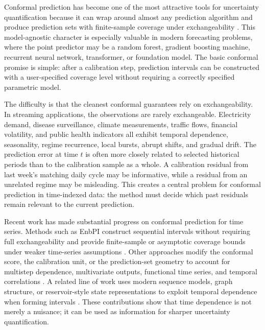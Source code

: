 \documentclass[11pt]{article}
\begin{document}
Conformal prediction has become one of the most attractive tools for uncertainty quantification because it can wrap around almost any prediction algorithm and produce prediction sets with finite-sample coverage under exchangeability \citep{vovk2005algorithmic,angelopoulos2021gentle}. This model-agnostic character is especially valuable in modern forecasting problems, where the point predictor may be a random forest, gradient boosting machine, recurrent neural network, transformer, or foundation model. The basic conformal promise is simple: after a calibration step, prediction intervals can be constructed with a user-specified coverage level without requiring a correctly specified parametric model.

The difficulty is that the cleanest conformal guarantees rely on exchangeability. In streaming applications, the observations are rarely exchangeable. Electricity demand, disease surveillance, climate measurements, traffic flows, financial volatility, and public health indicators all exhibit temporal dependence, seasonality, regime recurrence, local bursts, abrupt shifts, and gradual drift. The prediction error at time $t$ is often more closely related to selected historical periods than to the calibration sample as a whole. A calibration residual from last week's matching daily cycle may be informative, while a residual from an unrelated regime may be misleading. This creates a central problem for conformal prediction in time-indexed data: the method must decide which past residuals remain relevant to the current prediction.

Recent work has made substantial progress on conformal prediction for time series. Methods such as EnbPI construct sequential intervals without requiring full exchangeability and provide finite-sample or asymptotic coverage bounds under weaker time-series assumptions \citep{xu2020time}. Other approaches modify the conformal score, the calibration unit, or the prediction-set geometry to account for multistep dependence, multivariate outputs, functional time series, and temporal correlations \citep{sun2022copula,lee2025flow,cleaveland2023linear,xu2024ellipsoidal}. A related line of work uses modern sequence models, graph structure, or reservoir-style state representations to exploit temporal dependence when forming intervals \citep{auer2023hopfield,lee2024transformer,negli2025reservoir,cini2025relational}. These contributions show that time dependence is not merely a nuisance; it can be used as information for sharper uncertainty quantification.
\end{document}
